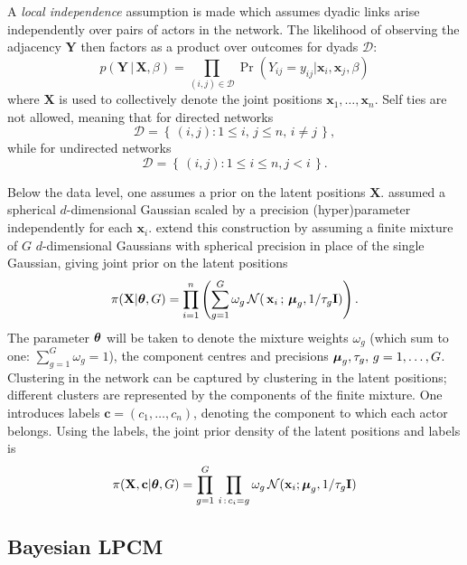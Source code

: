\documentclass[12pt]{article}
\newcommand{\x}{{\mathbf{x}}}
\newcommand{\bX}{{\mathbf{X}}}
\newcommand{\bY}{{\mathbf{Y}}}
\newcommand{\bc}{{\mathbf{c}}}
\newcommand{\I}{{\mathbf{I}}}
\newcommand{\bftheta}{\hbox{\boldmath$\theta$}}
\newcommand{\bfmu}{\hbox{\boldmath$\mu$}}
\begin{document}
A {\it local independence} assumption is made which assumes dyadic links arise independently over pairs of actors in the network. The likelihood of observing the adjacency $\bY$ then factors as a product over outcomes for dyads $\mathcal{D}$:
\begin{equation}
p(\bY\,|\,\bX,\beta) = \prod_{(i,j)\in \mathcal{D} } \Pr\left( Y_{ij} = y_{ij} | \x_i, \x_j, \beta \right)  \label{eq:like}
\end{equation}
where $\bX$ is used to collectively denote the joint positions $\x_1,\dots,\x_n$. Self ties are not allowed, meaning that for directed networks
\[
\mathcal{D} = \left\{\, (i,j) : 1 \leq i,\,j \leq n,\,  i\ne j\, \right\},
\]
while for undirected networks
\[
\mathcal{D} = \left\{ \,(i,j) : 1 \leq i \leq n, j < i\, \right\}.
\]

Below the data level, one assumes a prior on the latent positions $\bX$.  assumed a spherical $d$-dimensional Gaussian scaled by a precision (hyper)parameter independently for each $\x_i$.  extend this construction by assuming a finite mixture of $G$ $d$-dimensional Gaussians with spherical precision in place of the single Gaussian, giving joint prior on the latent positions
\begin{equation}
\pi(\bX|\bftheta,G) = \prod_{i=1}^n \left( \sum_{g=1}^G \omega_g \,\mathcal{N}( \,\x_i \,;\, \bfmu_g, 1/\tau_g \I  ) \right). \label{eq:jmix}
\end{equation}
The parameter $\bftheta$ will be taken to denote the mixture weights $\omega_g$ (which sum to one: $\sum_{g=1}^G \omega_g = 1$), the component centres and precisions $\bfmu_g, \tau_g, \, g = 1,\dots,G$. Clustering in the network can be captured by clustering in the latent positions; different clusters are represented by the components of the finite mixture. One introduces labels $\bc = (c_1,\dots,c_n)$, denoting the component to which each actor belongs. Using the labels, the joint prior density of the latent positions and labels is 
\begin{equation}
\pi(\bX,\bc | \bftheta, G ) = \prod_{g=1}^G \,\prod_{i\, : \,c_i = g} \omega_g \, \mathcal{N}(\x_i ;  \bfmu_g, 1/\tau_g \I) \label{eq:mixprior}
\end{equation}

\subsection{Bayesian LPCM} \label{sec:priors}
\end{document}
